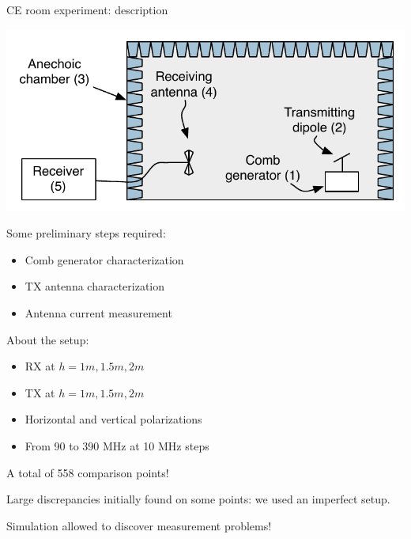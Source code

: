 \documentclass{beamer}
\begin{document}
\begin{frame}{CE room experiment: description}
    \footnotesize

    \begin{minipage}{0.48\textwidth}
        \includegraphics[width=\textwidth]{img/setup.pdf}

        Some preliminary steps required:
        \begin{itemize}
            \item Comb generator characterization
            \item TX antenna characterization
            \item Antenna current measurement
        \end{itemize}
    \end{minipage}
    \hfill
    \begin{minipage}{0.48\textwidth}
        About the setup:
        \begin{itemize}
            \item RX at $h = {1m, 1.5m, 2m}$
            \item TX at $h = {1m, 1.5m, 2m}$
            \item Horizontal and vertical polarizations
            \item From 90 to 390 MHz at 10 MHz steps
        \end{itemize}
        A total of 558 comparison points!
    \end{minipage}
    \vfill

    Large discrepancies initially found on some points: we used an imperfect setup. 
    
    \textcolor{uniud-orange}{Simulation allowed to discover measurement problems!}

\end{frame}
\end{document}
